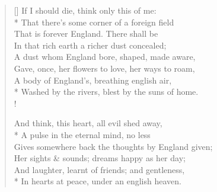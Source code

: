 \documentclass[MAIN]{subfiles}
\begin{document}
\settowidth{\versewidth}{\vin That there's some corner of a foreign field}
\begin{verse}[\versewidth]
If I should die, think only this of me:\\*
\vin That there's some corner of a foreign field\\
That is forever England. There shall be\\
\vin In that rich earth a richer dust concealed;\\
A dust whom England bore, shaped, made aware,\\
\vin Gave, once, her flowers to love, her ways to roam,\\
A body of England's, breathing english air,\\*
\vin Washed by the rivers, blest by the suns of home.\\!

And think, this heart, all evil shed away,\\*
\vin A pulse in the eternal mind, no less\\
\vin \vin Gives somewhere back the thoughts by England given;\\
Her sights \& sounds; dreams happy as her day;\\
\vin And laughter, learnt of friends; and gentleness,\\*
\vin \vin In hearts at peace, under an english heaven.
\end{verse}
\end{document}
